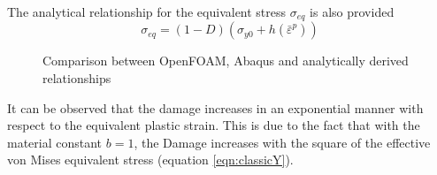 \documentclass[sn-mathphys,Numbered,draft]{sn-jnl}%
\begin{document}
\begin{appendices}
The analytical relationship for the equivalent stress $\sigma_{eq}$ is also provided 
\begin{equation}
    \sigma_{eq}=(1-D)(\sigma_{y0}+h({\bar{\varepsilon}}^p))
\end{equation}

\begin{figure}[htbp]
	\centering
	\caption{Comparison between OpenFOAM, Abaqus and analytically derived relationships}
	\label{label_for_entire_figure}
\end{figure}



It can be observed that the damage increases in an exponential manner with respect to the equivalent plastic strain. This is due to the fact that with the material constant $b=1$, the Damage increases with the square of the effective von Mises equivalent stress (equation \ref{eqn:classicY}).


\end{appendices}
\end{document}
